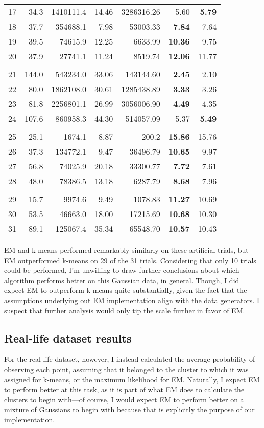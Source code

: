 \documentclass{journal}
\begin{document}
\begin{table}[hp]
\begin{tabular}{lrrrrrr}
    17 & 34.3 & 1410111.4 & 14.46 & 3286316.26 & 5.60 & \textbf{5.79} \\
    18 & 37.7 & 354688.1 & 7.98 & 53003.33 & \textbf{7.84} & 7.64 \\
    19 & 39.5 & 74615.9 & 12.25 & 6633.99 & \textbf{10.36} & 9.75 \\
    20 & 37.9 & 27741.1 & 11.24 & 8519.74 & \textbf{12.06} & 11.77 \\ \\

    21 & 144.0 & 543234.0 & 33.06 & 143144.60 & \textbf{2.45} & 2.10 \\
    22 & 80.0 & 1862108.0 & 30.61 & 1285438.89 & \textbf{3.33} & 3.26 \\
    23 & 81.8 & 2256801.1 & 26.99 & 3056006.90 & \textbf{4.49} & 4.35 \\
    24 & 107.6 & 860958.3 & 44.30 & 514057.09 & 5.37 & \textbf{5.49} \\ \\

    25 & 25.1 & 1674.1 & 8.87 & 200.2 & \textbf{15.86} & 15.76 \\
    26 & 37.3 & 134772.1 & 9.47  & 36496.79 & \textbf{10.65} & 9.97 \\
    27 & 56.8 & 74025.9 & 20.18 & 33300.77 & \textbf{7.72} & 7.61 \\
    28 & 48.0 & 78386.5 & 13.18 & 6287.79 & \textbf{8.68} & 7.96 \\ \\

    29 & 15.7 & 9974.6 & 9.49 & 1078.83 & \textbf{11.27} & 10.69 \\
    30 & 53.5 & 46663.0 & 18.00 & 17215.69 & \textbf{10.68} & 10.30 \\
    31 & 89.1 & 125067.4 & 35.34 & 65548.70 & \textbf{10.57} & 10.43
\end{tabular}
\end{table}

EM and k-means performed remarkably similarly on these artificial trials, but
EM outperformed k-means on 29 of the 31 trials. Considering that only
10 trials could be performed, I'm unwilling
to draw further conclusions about which algorithm performs better on this
Gaussian data, in general. Though,
I did expect EM to outperform k-means quite substantially, given the fact that
the assumptions underlying out EM implementation align with the data generators.
I suspect that further analysis would only tip the scale further in favor of EM.

\subsection{Real-life dataset results}
For the real-life dataset, however, I instead calculated the average probability
of observing each point, assuming that it belonged to the cluster to which it
was assigned for k-means, or the maximum likelihood for EM. Naturally, I expect
EM to perform better at this task, as it is
part of what EM does to calculate the clusters to begin with---of course, I
would expect EM to perform better on a mixture of Gaussians to begin with
because that is explicitly the purpose of our implementation.
\end{document}
